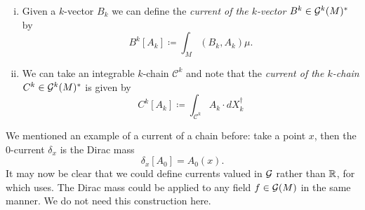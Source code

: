 \documentclass{article}
\begin{document}
\begin{enumerate}[i.]
    \item Given a $k$-vector $B_{k}$ we can define the \emph{current of the $k$-vector} $B^k\in \mathcal{G}^k(M)^*$ by
\begin{equation}
\label{eq:multivector_current}
    B^k[A_k] \coloneqq \int_M (B_k,A_k) \mu.
\end{equation}

    \item We can take an integrable $k$-chain $\mathscr{C}^k$ and note that the \emph{current of the $k$-chain} $C^k \in \mathcal{G}^k(M)^*$ is given by
\begin{equation}
\label{eq:chain_current}
    C^k[A_k] \coloneqq \int_{\mathscr{C}^k} A_k \cdot dX_k^\dagger
\end{equation}

\end{enumerate}

We mentioned an example of a current of a chain before: take a point $x$, then the 0-current $\delta_x$ is the Dirac mass
\begin{equation}
\delta_x[A_0] = A_0(x).
\end{equation}
It may now be clear that we could define currents valued in $\mathcal{G}$ rather than $\mathbb{R}$, for which  uses. The Dirac mass could be applied to any field $f\in \mathcal{G}(M)$ in the same manner. We do not need this construction here.
\end{document}
